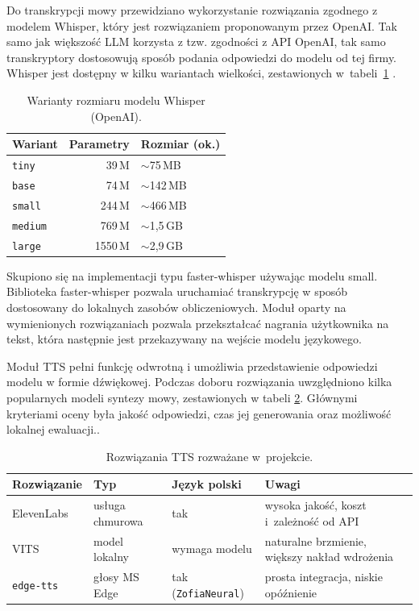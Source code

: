 Do transkrypcji mowy przewidziano wykorzystanie rozwiązania zgodnego z modelem Whisper, który jest rozwiązaniem proponowanym przez OpenAI. Tak samo jak większość LLM korzysta z tzw. zgodności z API OpenAI, tak samo transkryptory dostosowują sposób podania odpowiedzi do modelu od tej firmy. Whisper jest dostępny w kilku wariantach wielkości, zestawionych w~tabeli~\ref{tab:whisper_modele} \cite{Radford2023}.

\begin{table}[H]
  \centering
  \caption{Warianty rozmiaru modelu Whisper (OpenAI).}
  \label{tab:whisper_modele}
  \begin{tabular}{lrl}
    \hline
    Wariant & Parametry & Rozmiar (ok.) \\
    \hline
    \texttt{tiny}   & 39\,M   & $\sim$75\,MB \\
    \texttt{base}   & 74\,M   & $\sim$142\,MB \\
    \texttt{small}  & 244\,M  & $\sim$466\,MB \\
    \texttt{medium} & 769\,M  & $\sim$1,5\,GB \\
    \texttt{large}  & 1550\,M & $\sim$2,9\,GB \\
    \hline
  \end{tabular}
\end{table}

Skupiono się na implementacji typu faster-whisper używając modelu small. Biblioteka faster-whisper pozwala uruchamiać transkrypcję w sposób dostosowany do lokalnych zasobów obliczeniowych. Moduł oparty na wymienionych rozwiązaniach pozwala przekształcać nagrania użytkownika na tekst, która następnie jest przekazywany na wejście modelu językowego. 

Moduł TTS pełni funkcję odwrotną i umożliwia przedstawienie odpowiedzi modelu w formie dźwiękowej. Podczas doboru rozwiązania uwzględniono kilka popularnych modeli syntezy mowy, zestawionych w tabeli \ref{tab:tts_rozwiazania}. Głównymi kryteriami oceny była jakość  odpowiedzi, czas jej generowania oraz możliwość lokalnej ewaluacji..

\begin{table}[H]
  \centering
  \caption{Rozwiązania TTS rozważane w~projekcie.}
  \label{tab:tts_rozwiazania}
  \begin{tabular}{llll}
    \hline
    Rozwiązanie & Typ & Język polski & Uwagi \\
    \hline
    ElevenLabs \cite{ElevenLabs} & usługa chmurowa & tak & wysoka jakość, koszt i~zależność od API \\
    VITS \cite{Kim2021} & model lokalny & wymaga modelu & naturalne brzmienie, większy nakład wdrożenia \\
    \texttt{edge-tts} \cite{EdgeTTS} & głosy MS Edge & tak (\texttt{ZofiaNeural}) & prosta integracja, niskie opóźnienie \\
    \hline
  \end{tabular}
\end{table}

